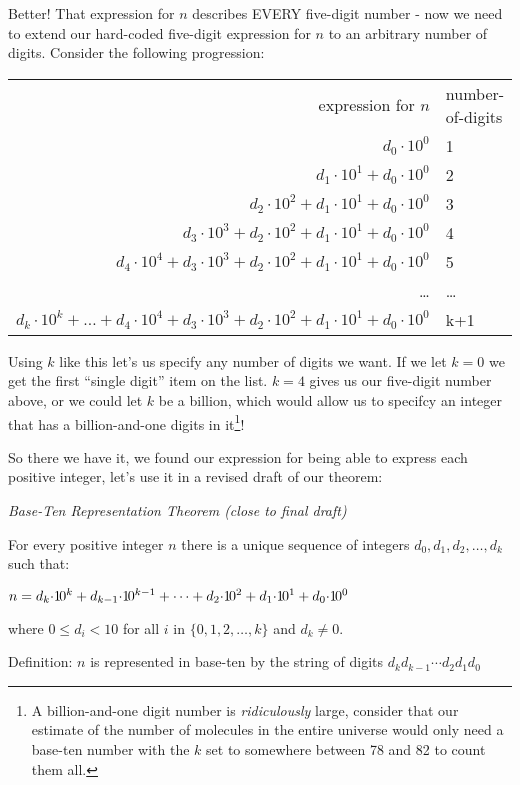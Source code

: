 \documentclass{article}
\newenvironment{jprIn}{\begin{adjustwidth}{2em}{}}{\end{adjustwidth}}
\begin{document}
Better! That expression for $n$ describes EVERY five-digit number - now we need to extend
our hard-coded five-digit expression for $n$ to an arbitrary
number of digits.
Consider the following progression:
\begin{center}
\begin{tabular}{r l}
expression for $n$ & number-of-digits\\
$d_0{\cdot}10^0$ & 1\\
$d_1{\cdot}10^1+d_0{\cdot}10^0$ & 2\\
$d_2{\cdot}10^2+d_1{\cdot}10^1+d_0{\cdot}10^0$ & 3\\
$d_3{\cdot}10^3+d_2{\cdot}10^2+d_1{\cdot}10^1+d_0{\cdot}10^0$ & 4\\
$d_4{\cdot}10^4+d_3{\cdot}10^3+d_2{\cdot}10^2+d_1{\cdot}10^1+d_0{\cdot}10^0$ & 5\\
\dots{} & \dots{}\\
$d_k{\cdot}10^k+\dots{}+d_4{\cdot}10^4+d_3{\cdot}10^3+d_2{\cdot}10^2+d_1{\cdot}10^1+d_0{\cdot}10^0$ & k+1
\end{tabular}
\end{center}
Using $k$ like this let's us specify any number of digits we want.
If we let $k=0$ we get the first ``single digit'' 
item on the list.  $k=4$ gives us our five-digit number above,
or we could let $k$ be a billion, which would allow
us to specifcy an integer that has a billion-and-one
digits in it\footnote{A billion-and-one digit number is 
\emph{ridiculously} large,
consider that our estimate of the number of molecules in
the entire universe would only need a base-ten
number with the $k$ set to somewhere between 78 and 82 to count them all.}!

So there we have it, we found our expression for being able to
express each positive integer, let's use
it in a revised draft of our theorem:

\emph{Base-Ten Representation Theorem (close to final draft)}
\begin{jprIn}
For every positive integer $n$ there is a unique sequence
of integers $d_0, d_1, d_2,\dots{},d_k$ such that:

\hspace{3em}$n=d_k{\cdot}{1\hspace{-0.12em}0}^k+d_{k-1}{\cdot}{1\hspace{-0.12em}0}^{k-1}+\dots+d_2{\cdot}{1\hspace{-0.12em}0}^2+d_1{\cdot}{1\hspace{-0.12em}0}^1+d_0{\cdot}{1\hspace{-0.12em}0}^0$

where $0\le{}d_i<10$ for all $i$ in $\{0,1,2,\dots{},k\}$ and $d_k\ne0$.

Definition: $n$ is represented in base-ten by the string of digits $d_kd_{k-1}{\cdots}d_2d_1d_0$
\end{jprIn}
\end{document}
